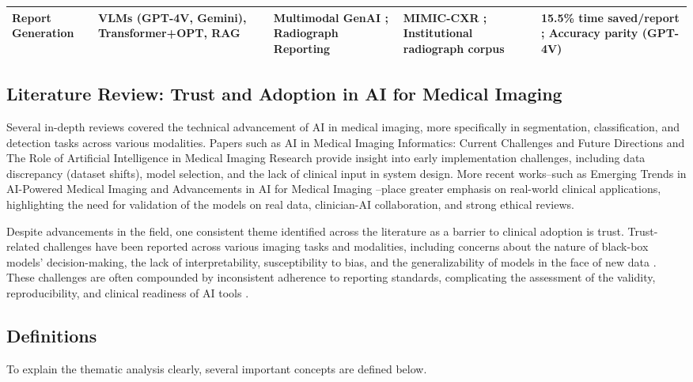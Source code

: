 \documentclass{article}
\begin{document}
\begin{table}[htbp]
\begin{tabularx}{\textwidth}{@{}p{2.4cm} p{3.2cm} Y Y Y@{}}
Report Generation &
VLMs (GPT-4V, Gemini), Transformer+OPT, RAG &
Multimodal GenAI \cite{rao_2025_multimodal}; Radiograph Reporting \cite{huang_2025_efficiency} &
MIMIC-CXR \cite{rao_2025_multimodal}; Institutional radiograph corpus &
15.5\% time saved/report \cite{huang_2025_efficiency}; Accuracy parity (GPT-4V) \cite{rao_2025_multimodal} \\

\bottomrule
\end{tabularx}
\end{table}

\subsection{Literature Review: Trust and Adoption in AI for Medical Imaging}
Several in-depth reviews covered the technical advancement of AI in medical imaging, more specifically in segmentation, classification, and detection tasks across various modalities. Papers such as AI in Medical Imaging Informatics: Current Challenges and Future Directions \cite{panayides_2020_ai} and The Role of Artificial Intelligence in Medical Imaging Research \cite{tang_2019_the} provide insight into early implementation challenges, including data discrepancy (dataset shifts), model selection, and the lack of clinical input in system design. More recent works–such as Emerging Trends in AI-Powered Medical Imaging \cite{oyeniyi_2024_emerging} and Advancements in AI for Medical Imaging \cite{zakaria_2024_advancements} –place greater emphasis on real-world clinical applications, highlighting the need for validation of the models on real data, clinician-AI collaboration, and strong ethical reviews.

Despite advancements in the field, one consistent theme identified across the literature as a barrier to clinical adoption is trust. Trust-related challenges have been reported across various imaging tasks and modalities, including concerns about the nature of black-box models' decision-making, the lack of interpretability, susceptibility to bias, and the generalizability of models in the face of new data \cite{borys_2023_explainable, burakkoak_2024_bias, yang_2024_the}. These challenges are often compounded by inconsistent adherence to reporting standards, complicating the assessment of the validity, reproducibility, and clinical readiness of AI tools \cite{kolbinger_2024_reporting}.

\subsection{Definitions}
To explain the thematic analysis clearly, several important concepts are defined below.
\end{document}
